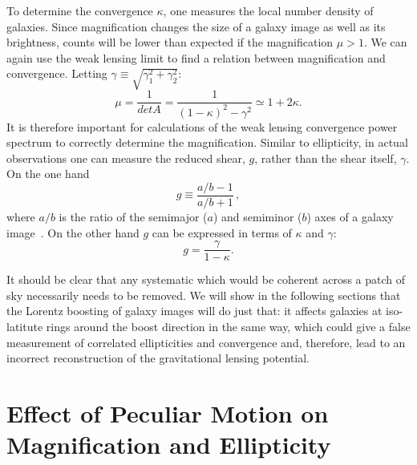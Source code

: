 \documentclass[useAMS,fleqn, usenatbib]{mn2e}
\begin{document}
To determine the convergence $\kappa$, one measures the local number density of galaxies. 
Since magnification changes the size of a galaxy image as well as its brightness,
counts will be lower than expected if the magnification $\mu > 1$. We can again use
the weak lensing limit to find a relation between magnification and convergence. Letting
$\gamma \equiv \sqrt{\gamma_1^2+\gamma_2^2}$:
\begin{equation}
\mu = \frac{1}{det A} = \frac{1}{(1-\kappa)^2-\gamma^2}\simeq1+2\kappa .
\end{equation}
It is therefore important for calculations
of the weak lensing convergence power spectrum to correctly determine the magnification.
Similar to ellipticity, in  actual observations one can measure the reduced shear, $g$,
rather than the shear itself, $\gamma$.  
On the one hand
\begin{equation}\label{rs}
g\equiv\frac{a/b-1}{a/b+1}\,,
\end{equation}
where $a/b$ is the ratio of the semimajor ($a$) and semiminor ($b$)
axes of a galaxy image~\citep{Schneider:2005ka}.
On the other hand $g$  can be expressed in terms
of $\kappa$ and $\gamma$:
\begin{equation}\label{rs}
g=\frac{\gamma}{1-\kappa}.
\end{equation}


It should be clear that any systematic which would be coherent across a patch of sky necessarily
needs to be removed. We will show in the following sections that the Lorentz boosting of galaxy images will
do just that: it affects galaxies at iso-latitute rings around the boost direction
in the same way, which could give a false measurement of correlated ellipticities and convergence 
and, therefore, lead to an incorrect reconstruction of the gravitational lensing potential.


\section{Effect of Peculiar Motion on Magnification and Ellipticity}
\label{peculiar}
\end{document}
